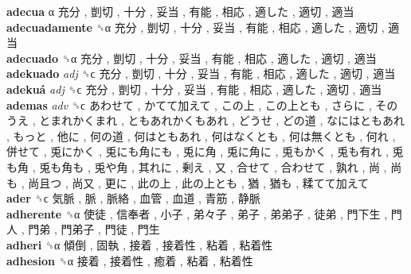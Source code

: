 \textbf{adecua} α   充分 ,  剴切 ,  十分 ,  妥当 ,  有能 ,  相応 ,  適した ,  適切 ,  適当   \\
\textbf{adecuadamente} ␝α   充分 ,  剴切 ,  十分 ,  妥当 ,  有能 ,  相応 ,  適した ,  適切 ,  適当   \\
\textbf{adecuado} ␝α   充分 ,  剴切 ,  十分 ,  妥当 ,  有能 ,  相応 ,  適した ,  適切 ,  適当   \\
\textbf{adekuado} \emph{adj}  ␝ϲ   充分 ,  剴切 ,  十分 ,  妥当 ,  有能 ,  相応 ,  適した ,  適切 ,  適当   \\
\textbf{adekuá} \emph{adj}  ␝ϲ   充分 ,  剴切 ,  十分 ,  妥当 ,  有能 ,  相応 ,  適した ,  適切 ,  適当   \\
\textbf{ademas} \emph{adv}  ␝ϲ   あわせて ,  かてて加えて ,  この上 ,  この上とも ,  さらに ,  そのうえ ,  とまれかくまれ ,  ともあれかくもあれ ,  どうせ ,  どの道 ,  なにはともあれ ,  もっと ,  他に ,  何の道 ,  何はともあれ ,  何はなくとも ,  何は無くとも ,  何れ ,  併せて ,  兎にかく ,  兎にも角にも ,  兎に角 ,  兎に角に ,  兎もかく ,  兎も有れ ,  兎も角 ,  兎も角も ,  兎や角 ,  其れに ,  剰え ,  又 ,  合せて ,  合わせて ,  孰れ ,  尚 ,  尚も ,  尚且つ ,  尚又 ,  更に ,  此の上 ,  此の上とも ,  猶 ,  猶も ,  糅てて加えて   \\
\textbf{ader} ␝ϲ   気脈 ,  脈 ,  脈絡 ,  血管 ,  血道 ,  青筋 ,  静脈   \\
\textbf{adherente} ␝α   使徒 ,  信奉者 ,  小子 ,  弟々子 ,  弟子 ,  弟弟子 ,  徒弟 ,  門下生 ,  門人 ,  門弟 ,  門弟子 ,  門徒 ,  門生   \\
\textbf{adheri} ␝α   傾倒 ,  固執 ,  接着 ,  接着性 ,  粘着 ,  粘着性   \\
\textbf{adhesion} ␝α   接着 ,  接着性 ,  癒着 ,  粘着 ,  粘着性   \\
